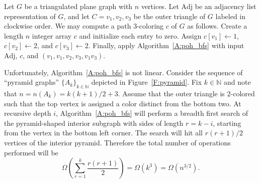 \documentclass[12pt,letterpaper]{article}
\theoremstyle{plain}
\theoremstyle{definition}
\theoremstyle{break}
\begin{document}
Let $G$ be a triangulated plane graph with $n$ vertices. Let
$\text{Adj}$ be an adjacency list representation of $G$, and
let $C=v_1,v_2,v_3$ be the outer triangle of $G$ labeled in clockwise order.
We may compute a path $3$-coloring $c$ of $G$ as follows.
Create a length $n$ integer array $c$ and initialize each entry to zero.
Assign $c[v_1]\leftarrow 1$,
$c[v_2]\leftarrow 2$, and $c[v_3]\leftarrow 2$. Finally, apply
Algorithm~\ref{A:poh_bfs}
with input $\text{Adj}$, $c$, and $(v_1, v_1, v_2, v_3, v_1v_3)$.

Unfortunately, Algorithm~\ref{A:poh_bfs}
is not linear. Consider the sequence of ``pyramid graphs''
$\{A_k\}_{k\in\mathbb{N}}$ depicted in
Figure~\ref{F:pyramid}.
Fix $k\in\mathbb{N}$ and note that
$n=n(A_k)=k(k+1)/2+3$.
Assume that
the outer triangle is $2$-colored such that the top vertex is
assigned a color distinct from the bottom two. At recursive depth $i$,
Algorithm~\ref{A:poh_bfs} will perform a breadth first search of the
pyramid-shaped interior  subgraph with sides of length $r=k-i$, starting
from the vertex in the bottom left corner. The search will hit all
$r(r+1)/2$ vertices of the interior pyramid.
Therefore the total number of operations performed will be
\[
    \Omega\left( \sum_{r=1}^k\frac{r(r+1)}{2} \right)
    =\Omega(k^3)
    =\Omega(n^{3/2}).
\]
\end{document}
